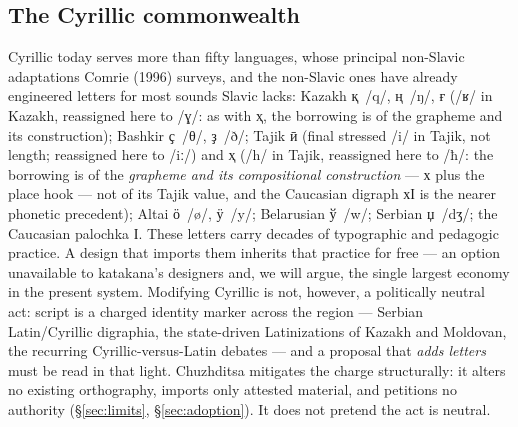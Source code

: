 \documentclass[11pt]{article}
\newcommand{\cz}[1]{{\chu #1}}
\newcommand{\ph}[1]{{\ipafont/#1/}}
\begin{document}
\subsection{The Cyrillic commonwealth}
Cyrillic today serves more than fifty languages, whose principal non-Slavic adaptations Comrie (1996) surveys, and the non-Slavic ones have already engineered letters for most sounds Slavic lacks: Kazakh \cz{қ}~\ph{q}, \cz{ң}~\ph{ŋ}, \cz{ғ} (\ph{ʁ} in Kazakh, reassigned here to \ph{ɣ}: as with \cz{ҳ}, the borrowing is of the grapheme and its construction); Bashkir \cz{ҫ}~\ph{θ}, \cz{ҙ}~\ph{ð}; Tajik \cz{ӣ} (final stressed \ph{i} in Tajik, not length; reassigned here to \ph{iː}) and \cz{ҳ} (\ph{h} in Tajik, reassigned here to \ph{ħ}: the borrowing is of the \emph{grapheme and its compositional construction} — х plus the place hook — not of its Tajik value, and the Caucasian digraph хӀ is the nearer phonetic precedent); Altai \cz{ӧ}~\ph{ø}, \cz{ӱ}~\ph{y}; Belarusian \cz{ў}~\ph{w}; Serbian \cz{џ}~\ph{dʒ}; the Caucasian palochka \cz{Ӏ}. These letters carry decades of typographic and pedagogic practice. A design that imports them inherits that practice for free — an option unavailable to katakana's designers and, we will argue, the single largest economy in the present system. Modifying Cyrillic is not, however, a politically neutral act: script is a charged identity marker across the region — Serbian Latin/Cyrillic digraphia, the state-driven Latinizations of Kazakh and Moldovan, the recurring Cyrillic-versus-Latin debates — and a proposal that \emph{adds letters} must be read in that light. Chuzhditsa mitigates the charge structurally: it alters no existing orthography, imports only attested material, and petitions no authority (\S\ref{sec:limits}, \S\ref{sec:adoption}). It does not pretend the act is neutral.
\end{document}
